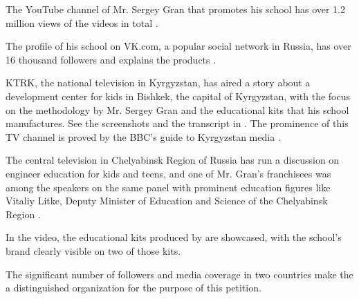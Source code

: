 
The YouTube channel of Mr. Sergey Gran that promotes his school
has over 1.2 million views of the videos in total .

The profile of his school on VK.com, a popular social network in Russia,
has over 16 thousand followers and explains the products .

KTRK, the national television in Kyrgyzstan, has aired a story
about a development center for kids in Bishkek, the capital of Kyrgyzstan,
with the focus on the methodology by Mr. Sergey Gran and the educational kits
that his school manufactures.
See the screenshots and the transcript in .
The prominence of this TV channel is proved by the BBC's guide to Kyrgyzstan media
.

The central television in Chelyabinsk Region of Russia
has run a discussion on engineer education for kids and teens,
and one of Mr. Gran's franchisees was among the speakers
on the same panel with prominent education figures like
Vitaliy Litke, Deputy Minister of Education and Science of the Chelyabinsk Region
.

In the video, the educational kits produced by \GSchool are showcased,
with the school's brand clearly visible on two of those kits.

The significant number of followers and media coverage in two countries
make the \GSchool a distinguished organization for the purpose of this petition.
